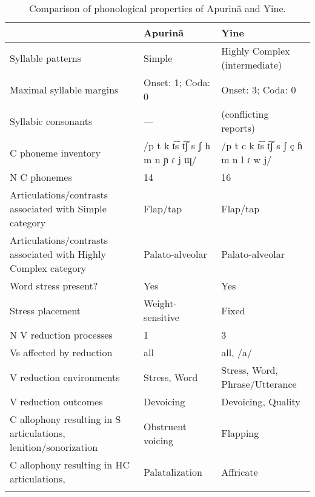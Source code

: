 \begin{table}
\begin{tabularx}{\textwidth}{Qp{3cm}p{3cm}}
\lsptoprule
 & {Apurinã} & {Yine}\\
 \midrule 
 {Syllable patterns} & Simple & Highly Complex (intermediate)\\
 \tablevspace
 {Maximal syllable margins} & Onset: 1; Coda: 0 & Onset: 3; Coda: 0\\
 \tablevspace
 {Syllabic consonants} & — & (conflicting reports)\\
 \tablevspace
 {C phoneme inventory} & /p t k t͡s t͡ʃ s ʃ h m n ɲ ɾ j ɰ/ & /p t c k t͡s t͡ʃ s ʃ ç ɦ m n l ɾ w j/\\
 \tablevspace
 {N C phonemes} & 14 & 16\\
 \tablevspace
 {Articulations/contrasts associated with {Simple}} {category} & {Flap/tap} & {Flap/tap}\\
 \tablevspace
 {Articulations/contrasts associated with {Highly Complex}} {category} & { {Palato-alveolar}} & { {Palato-alveolar}}\\
 \tablevspace
 {Word stress present?} & {Yes} & {Yes}\\
 \tablevspace
 {Stress placement} & {Weight-sensitive} & {Fixed}\\
 \tablevspace
 {N V reduction processes} & {1} & {3}\\
 \tablevspace
 {Vs affected by reduction}  & {all} & {all, /a/}\\
 \tablevspace
 {V reduction environments} & {Stress, Word} & {Stress, Word, Phrase/Utterance}\\
 \tablevspace
 {V reduction outcomes} & {Devoicing} & {Devoicing, Quality}\\
 \tablevspace
 {C allophony resulting in S articulations, lenition/sonorization} & {Obstruent voicing} & { {Flapping}}\\
 \tablevspace
 {{C allophony resulting in HC articulations,} } & {Palatalization} & { {Affricate}}\\
\lspbottomrule
\end{tabularx}
\caption{\label{tab:8.3}Comparison of phonological properties of Apurinã and Yine.}
\end{table}

